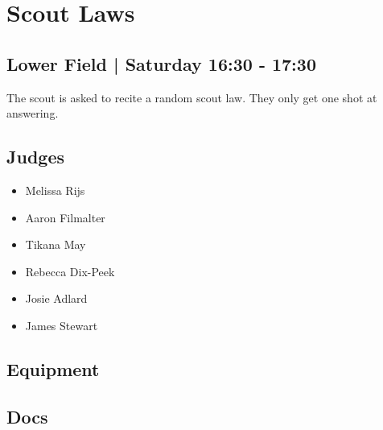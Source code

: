 \documentclass[10pt]{article}
\begin{document}
		\begin{minipage}{\linewidth}
		\setcounter{section}{14}
	\section{Scout Laws }
	\subsection*{Lower Field | Saturday 16:30 - 17:30}

	The scout is asked to recite a random scout law. They only get one shot at answering.

	\begin{multicols}{2}
	\subsection*{\faUsers \: Judges}
	\begin{itemize}
			\item Melissa Rijs
			\item Aaron Filmalter
			\item Tikana May
			\item Rebecca Dix-Peek
			\item Josie Adlard
			\item James Stewart
		\end{itemize}
	\columnbreak
	\subsection*{\faWrench \: Equipment}
	        \vfill\null
        \subsection*{\faFile \: Docs}
     	\end{multicols}


	\vspace{1cm}
	\end{minipage}
\end{document}
